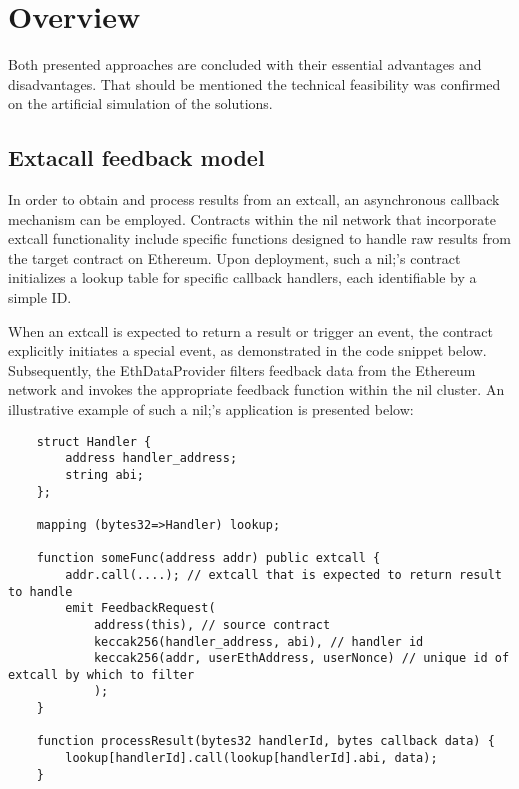 \section{Overview}
\label{section:overview}

Both presented approaches are concluded with their essential advantages and disadvantages. 
That should be mentioned the technical feasibility was confirmed on the artificial simulation of 
the solutions.






\subsection{Extacall feedback model}
In order to obtain and process results from an extcall, an asynchronous callback mechanism can 
be employed. Contracts within the nil network that incorporate extcall functionality include 
specific functions designed to handle raw results from the target contract on Ethereum. Upon 
deployment, such a nil;'s contract initializes a lookup table for specific callback handlers, 
each identifiable by a simple ID.

When an extcall is expected to return a result or trigger an event, the contract explicitly 
initiates a special event, as demonstrated in the code snippet below. Subsequently, the 
EthDataProvider filters feedback data from the Ethereum network and invokes the appropriate 
feedback function within the nil cluster. An illustrative example of such a nil;'s application 
is presented below:

\begin{verbatim}
    struct Handler {
        address handler_address;
        string abi;
    };

    mapping (bytes32=>Handler) lookup;

    function someFunc(address addr) public extcall {
        addr.call(....); // extcall that is expected to return result to handle
        emit FeedbackRequest(
            address(this), // source contract
            keccak256(handler_address, abi), // handler id
            keccak256(addr, userEthAddress, userNonce) // unique id of extcall by which to filter
            );
    }

    function processResult(bytes32 handlerId, bytes callback data) {
        lookup[handlerId].call(lookup[handlerId].abi, data);
    }
\end{verbatim}
